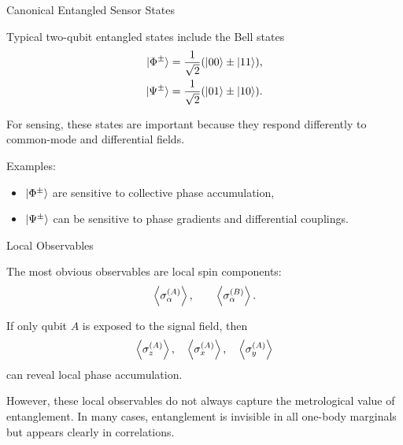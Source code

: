 \documentclass{beamer}
\begin{document}
\begin{frame}{Canonical Entangled Sensor States}

Typical two-qubit entangled states include the Bell states
\begin{align}
\ket{\Phi^\pm} &= \frac{1}{\sqrt{2}}(\ket{00}\pm\ket{11}),\\
\ket{\Psi^\pm} &= \frac{1}{\sqrt{2}}(\ket{01}\pm\ket{10}).
\end{align}

For sensing, these states are important because they respond differently to
common-mode and differential fields.

Examples:
\begin{itemize}
    \item $\ket{\Phi^\pm}$ are sensitive to collective phase accumulation,
    \item $\ket{\Psi^\pm}$ can be sensitive to phase gradients and differential couplings.
\end{itemize}

\end{frame}

\begin{frame}{Local Observables}

The most obvious observables are local spin components:
\[
\expval{\sigma_\alpha^{(A)}}, \qquad \expval{\sigma_\alpha^{(B)}}.
\]

If only qubit $A$ is exposed to the signal field, then
\[
\expval{\sigma_z^{(A)}}, \quad \expval{\sigma_x^{(A)}}, \quad \expval{\sigma_y^{(A)}}
\]
can reveal local phase accumulation.

However, these local observables do not always capture the metrological value
of entanglement. In many cases, entanglement is invisible in all one-body marginals
but appears clearly in correlations.

\end{frame}
\end{document}
